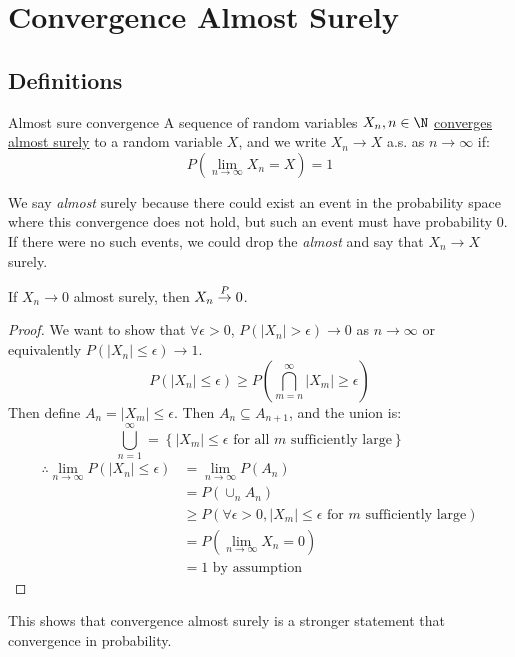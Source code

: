 \documentclass[../Main.tex]{subfiles}
\begin{document}
\section{Convergence Almost Surely}
\subsection{Definitions}
\begin{definition}{Almost sure convergence}
    A sequence of random variables $X_n, n \in \N$ \underline{converges almost surely} to a random variable $X$, and we write $X_n \to X$ a.s. as $n \to \infty$ if:
    \begin{equation*}
        P\left(\lim_{n \to \infty} X_n = X\right) = 1
    \end{equation*}
\end{definition}
\begin{remark}
    We say \textit{almost} surely because there could exist an event in the probability space where this convergence does not hold, but such an event must have probability 0. If there were no such events, we could drop the \textit{almost} and say that $X_n \to X$ surely.
\end{remark}
\begin{lemma}
    If $X_n \to 0$ almost surely, then $X_n \overset{P}{\rightarrow} 0$.
    \label{lemASConvergeImpliesProbCoverge}
\end{lemma}
\begin{proof}
    We want to show that $\forall \epsilon > 0$, $P(|X_n| > \epsilon) \to 0$ as $n \to \infty$ or equivalently $P(|X_n| \leq \epsilon) \to 1$.
    \begin{equation*}
        P(|X_n| \leq \epsilon) \geq P\left(\bigcap_{m = n}^\infty {|X_m| \geq \epsilon}\right)
    \end{equation*}
    Then define $A_n = {|X_m| \leq \epsilon}$. Then $A_n \subseteq A_{n + 1}$, and the union is:
    \begin{equation*}
        \bigcup_{n = 1}^\infty = \left\{|X_m| \leq \epsilon \text{ for all } m \text{ sufficiently large}\right\}
    \end{equation*}
    \begin{align*}
        \therefore \lim_{n \to \infty} P(|X_n| \leq \epsilon) &= \lim_{n \to \infty} P(A_n) \\
        &= P\left(\cup_n A_n\right) \\
        &\geq P(\forall \epsilon > 0, |X_m| \leq \epsilon \text{ for } m \text{ sufficiently large}) \\
        &= P(\lim_{n \to \infty} X_n = 0) \\
        &= 1 \text{ by assumption}
    \end{align*}
\end{proof}
\begin{remark}
    This shows that convergence almost surely is a stronger statement that convergence in probability.
\end{remark}
\end{document}
